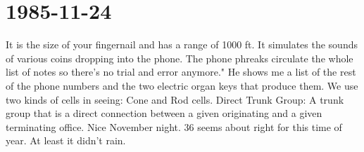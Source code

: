 \documentclass{article}
\begin{document}
\section*{1985{-}11{-}24}
It is the size of your fingernail and has a range of 1000 ft. It simulates the sounds of various coins dropping into the phone. The phone phreaks circulate the whole list of notes so there's no trial and error anymore."  He shows me a list of the rest of the phone numbers and the two electric organ keys that produce them. We use two kinds of cells in seeing: Cone 	and Rod cells. Direct Trunk Group: A trunk group that is a direct connection between a given originating and a given terminating office.  Nice November night. 36 seems about right for this time of year. At least it didn't rain.
\end{document}
